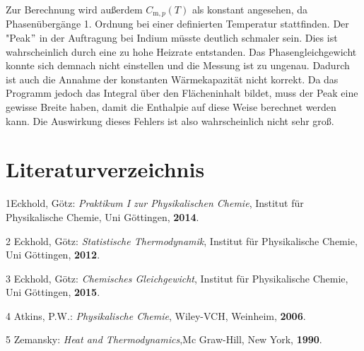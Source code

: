 \documentclass[12pt,a4paper,titlepage,headinclude,bibtotoc]{scrartcl}
\begin{document}
Zur Berechnung wird außerdem $C_{\mathrm{m},p}(T)$ als konstant angesehen, da Phasenübergänge 1. Ordnung bei einer definierten Temperatur stattfinden. Der "Peak$"$ in der Auftragung bei Indium müsste deutlich schmaler sein. Dies ist wahrscheinlich durch eine zu hohe Heizrate entstanden. Das Phasengleichgewicht konnte sich demnach nicht einstellen und die Messung ist zu ungenau. Dadurch ist auch die Annahme der konstanten Wärmekapazität nicht korrekt. Da das Programm jedoch das Integral über den Flächeninhalt bildet, muss der Peak eine gewisse Breite haben, damit die Enthalpie auf diese Weise berechnet werden kann. Die Auswirkung dieses Fehlers ist also wahrscheinlich nicht sehr groß.\\

\section{Literaturverzeichnis}
1\quad Eckhold, Götz: \emph{Praktikum I zur Physikalischen Chemie}, Institut für Physikalische Chemie, Uni Göttingen, \textbf{2014}.

\vspace{0,5 cm}

2 \quad Eckhold, Götz: \emph{Statistische Thermodynamik}, Institut für Physikalische Chemie, Uni Göttingen, \textbf{2012}.

\vspace{0,5cm}

3 \quad Eckhold, Götz: \emph{Chemisches Gleichgewicht}, Institut für Physikalische Chemie, Uni Göttingen, \textbf{2015}.\\

\vspace{0,5cm}

4 \quad Atkins, P.W.: \emph{Physikalische Chemie}, Wiley-VCH, Weinheim, \textbf{2006}.\\

\vspace{0,5cm}

5 \quad Zemansky: \emph{Heat and Thermodynamics},Mc Graw-Hill, New York, \textbf{1990}.\\
\end{document}
